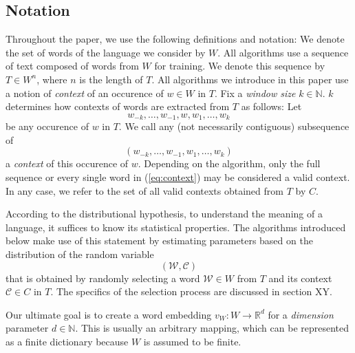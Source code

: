 \documentclass{amsart}
\theoremstyle{plain}
\theoremstyle{definition}
\newcommand{\R}{\mathbb{R}}
\newcommand{\N}{\mathbb{N}}
\begin{document}
\subsection{Notation}
Throughout the paper, we use the following definitions and notation:
We denote the set of words of the language we consider by $W$.
All algorithms use a sequence of text composed of words from $W$ for training.
We denote this sequence by $T \in W^n$, where $n$ is the length of $T$.
All algorithms we introduce in this paper use a notion of \emph{context} of an occurence of $w \in W$ in $T$.
Fix a \emph{window size} $k \in \N$.
$k$ determines how contexts of words are extracted from $T$ as follows:
Let
\begin{equation*}
  w_{-k}, \dots, w_{-1}, w, w_1, \dots, w_k
\end{equation*}
be any occurence of $w$ in $T$.
We call any (not necessarily contiguous) subsequence of
\begin{equation}
  \label{eq:context}
  (w_{-k}, \dots, w_{-1}, w_1, \dots, w_k)
\end{equation}
a \emph{context} of this occurence of $w$.
Depending on the algorithm, only the full sequence or every single word in (\ref{eq:context}) may be considered a valid context.
In any case, we refer to the set of all valid contexts obtained from $T$ by $C$.

According to the distributional hypothesis, to understand the meaning of a language, it suffices to know its statistical properties.
The algorithms introduced below make use of this statement by estimating parameters based on the distribution of the random variable
\begin{equation}
  (\mathcal{W}, \mathcal{C})
\end{equation}
that is obtained by randomly selecting a word $\mathcal{W} \in W$ from $T$ and its context $\mathcal{C} \in C$ in $T$.
The specifics of the selection process are discussed in section XY.

Our ultimate goal is to create a word embedding $v_W : W \rightarrow \R^d$ for a \emph{dimension} parameter $d \in \N$.
This is usually an arbitrary mapping, which can be represented as a finite dictionary because $W$ is assumed to be finite.
\end{document}
